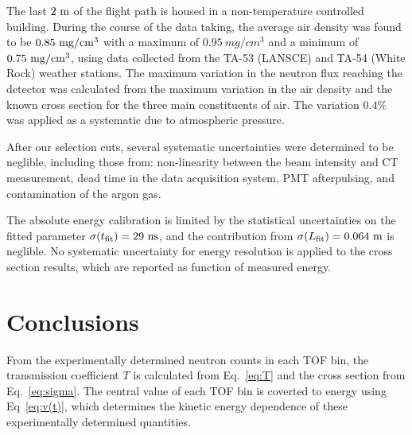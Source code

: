 \documentclass[%
 reprint,
superscriptaddress,
 preprintnumbers,
 nofootinbib,
 nobibnotes,
 bibnotes,
 amsmath,amssymb,
 aps,
 prl, 
 floatfix,
]{revtex4-1}
\begin{document}
The last $2~\rm m$ of the flight path is housed in a non-temperature
controlled building.  During the course of the data taking, the
average air density was found to be $0.85~{\rm mg/cm^3}$ with a maximum of
$0.95 \ mg/cm^3$ and a minimum of $0.75~{\rm mg/cm^3}$, using data
collected from the TA-53 (LANSCE) and TA-54 (White Rock) weather
stations.  The maximum variation in the neutron flux reaching the
detector was calculated from the maximum variation in the air density
and the known cross section for the three main constituents of air.
The variation $0.4\%$ was applied as a systematic due to atmospheric
pressure.

After our selection cuts, several systematic uncertainties were
determined to be neglible, including those from: non-linearity between
the beam intensity and CT measurement, dead time in the data
acquisition system, PMT afterpulsing, and contamination of the argon
gas.

The absolute energy calibration is limited by the statistical
uncertainties on the fitted parameter $\sigma(t_{\rm fit})=29~\rm ns$,
and the contribution from $\sigma(L_{\rm fit})=0.064~\rm m$ is
neglible.  No systematic uncertainty for energy resolution is applied
to the cross section results, which are reported as function of
measured energy.


\section{\label{sec:energy}Conclusions}

From the experimentally determined neutron counts in each TOF bin, the
transmission coefficient $T$ is calculated from Eq.~\ref{eq:T} and the
cross section from Eq.~\ref{eq:sigma}.  The central value of each TOF
bin is coverted to energy using Eq~\ref{eq:v(t)}, which determines the
kinetic energy dependence of these experimentally determined
quantities.
\end{document}
